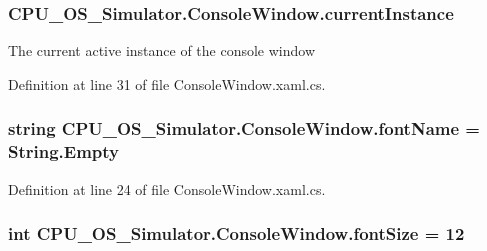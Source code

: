 \subsubsection[{current\+Instance}]{ C\+P\+U\+\_\+\+O\+S\+\_\+\+Simulator.\+Console\+Window.\+current\+Instance\hspace{0.3cm}{\ttfamily [static]}}\label{class_c_p_u___o_s___simulator_1_1_console_window_abee2fd1e118dd4f81dc2142bc033da4a}


The current active instance of the console window 



Definition at line 31 of file Console\+Window.\+xaml.\+cs.

\hypertarget{class_c_p_u___o_s___simulator_1_1_console_window_a78375ad950278e847c76e7de38aa1e31}{}
\subsubsection[{font\+Name}]{\setlength{\rightskip}{0pt plus 5cm}string C\+P\+U\+\_\+\+O\+S\+\_\+\+Simulator.\+Console\+Window.\+font\+Name = String.\+Empty\hspace{0.3cm}{\ttfamily [private]}}\label{class_c_p_u___o_s___simulator_1_1_console_window_a78375ad950278e847c76e7de38aa1e31}


Definition at line 24 of file Console\+Window.\+xaml.\+cs.

\hypertarget{class_c_p_u___o_s___simulator_1_1_console_window_a0c319b98b649d11ffa185590e771cbb1}{}
\subsubsection[{font\+Size}]{\setlength{\rightskip}{0pt plus 5cm}int C\+P\+U\+\_\+\+O\+S\+\_\+\+Simulator.\+Console\+Window.\+font\+Size = 12\hspace{0.3cm}{\ttfamily [private]}}\label{class_c_p_u___o_s___simulator_1_1_console_window_a0c319b98b649d11ffa185590e771cbb1}


